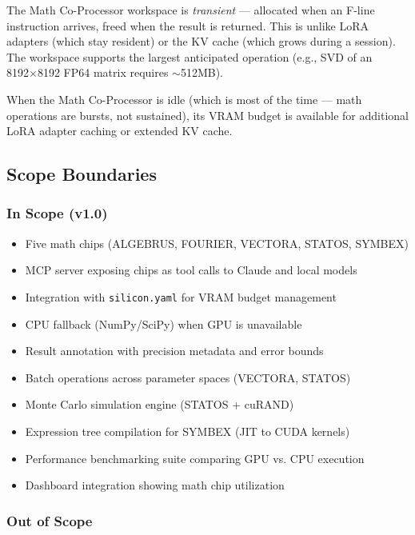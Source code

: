 \documentclass[11pt,letterpaper]{article}
\begin{document}
The Math Co-Processor workspace is \textit{transient} --- allocated when an F-line instruction arrives, freed when the result is returned. This is unlike LoRA adapters (which stay resident) or the KV cache (which grows during a session). The workspace supports the largest anticipated operation (e.g., SVD of an 8192×8192 FP64 matrix requires $\sim$512MB).

When the Math Co-Processor is idle (which is most of the time --- math operations are bursts, not sustained), its VRAM budget is available for additional LoRA adapter caching or extended KV cache.

\subsection{Scope Boundaries}

\subsubsection{In Scope (v1.0)}

\begin{itemize}[leftmargin=2em]
\item Five math chips (ALGEBRUS, FOURIER, VECTORA, STATOS, SYMBEX)
\item MCP server exposing chips as tool calls to Claude and local models
\item Integration with \texttt{silicon.yaml} for VRAM budget management
\item CPU fallback (NumPy/SciPy) when GPU is unavailable
\item Result annotation with precision metadata and error bounds
\item Batch operations across parameter spaces (VECTORA, STATOS)
\item Monte Carlo simulation engine (STATOS + cuRAND)
\item Expression tree compilation for SYMBEX (JIT to CUDA kernels)
\item Performance benchmarking suite comparing GPU vs. CPU execution
\item Dashboard integration showing math chip utilization
\end{itemize}

\subsubsection{Out of Scope}
\end{document}
